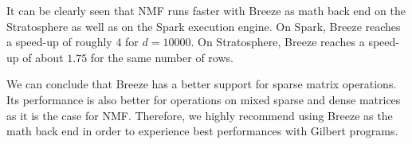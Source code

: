 It can be clearly seen that NMF runs faster with Breeze as math back end on the Stratosphere as well as on the Spark execution engine.
On Spark, Breeze reaches a speed-up of roughly $4$ for $d=10000$. 
On Stratosphere, Breeze reaches a speed-up of about $1.75$ for the same number of rows.

We can conclude that Breeze has a better support for sparse matrix operations.
Its performance is also better for operations on mixed sparse and dense matrices as it is the case for NMF.
Therefore, we highly recommend using Breeze as the math back end in order to experience best performances with Gilbert programs.

